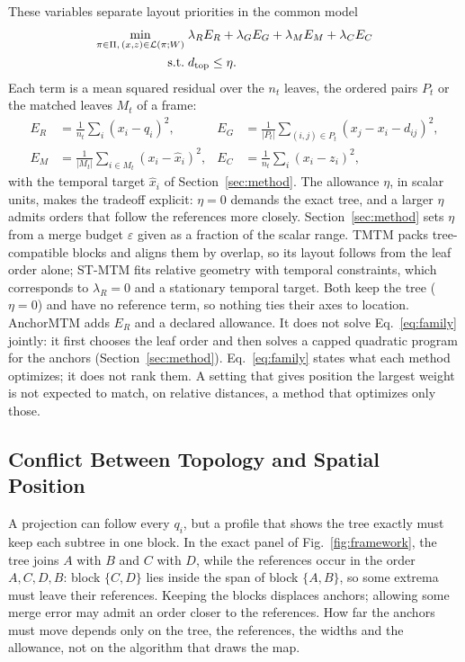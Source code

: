 These variables separate layout priorities in the common model
\begin{equation}\label{eq:family}
\begin{aligned}
\min_{\pi\in\Pi,\,(x,z)\in\mathcal{L}(\pi;W)}\;&\lambda_RE_R+\lambda_GE_G+\lambda_ME_M+\lambda_CE_C\\
\mathrm{s.t.}\;&d_{\mathrm{top}}\le\eta.
\end{aligned}
\end{equation}
Each term is a mean squared residual over the $n_t$ leaves, the ordered pairs $P_t$ or the matched leaves $M_t$ of a frame:
\begin{equation}\label{eq:terms}
\begin{aligned}
E_R&=\tfrac{1}{n_t}\textstyle\sum_i(x_i-q_i)^2, & E_G&=\tfrac{1}{|P_t|}\textstyle\sum_{(i,j)\in P_t}(x_j-x_i-d_{ij})^2,\\
E_M&=\tfrac{1}{|M_t|}\textstyle\sum_{i\in M_t}(x_i-\hat x_i)^2, & E_C&=\tfrac{1}{n_t}\textstyle\sum_i(x_i-z_i)^2,
\end{aligned}
\end{equation}
with the temporal target $\hat x_i$ of Section~\ref{sec:method}. The allowance $\eta$, in scalar units, makes the tradeoff explicit: $\eta=0$ demands the exact tree, and a larger $\eta$ admits orders that follow the references more closely. Section~\ref{sec:method} sets $\eta$ from a merge budget $\varepsilon$ given as a fraction of the scalar range. TMTM packs tree-compatible blocks and aligns them by overlap, so its layout follows from the leaf order alone; ST-MTM fits relative geometry with temporal constraints, which corresponds to $\lambda_R=0$ and a stationary temporal target. Both keep the tree ($\eta=0$) and have no reference term, so nothing ties their axes to location. AnchorMTM adds $E_R$ and a declared allowance. It does not solve Eq.~\ref{eq:family} jointly: it first chooses the leaf order and then solves a capped quadratic program for the anchors (Section~\ref{sec:method}). Eq.~\ref{eq:family} states what each method optimizes; it does not rank them. A setting that gives position the largest weight is not expected to match, on relative distances, a method that optimizes only those.

\subsection{Conflict Between Topology and Spatial Position}
A projection can follow every $q_i$, but a profile that shows the tree exactly must keep each subtree in one block. In the exact panel of Fig.~\ref{fig:framework}, the tree joins $A$ with $B$ and $C$ with $D$, while the references occur in the order $A,C,D,B$: block $\{C,D\}$ lies inside the span of block $\{A,B\}$, so some extrema must leave their references. Keeping the blocks displaces anchors; allowing some merge error may admit an order closer to the references. How far the anchors must move depends only on the tree, the references, the widths and the allowance, not on the algorithm that draws the map.

